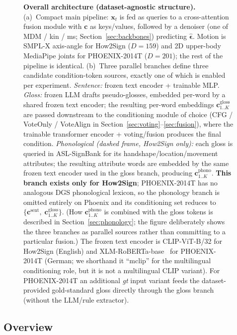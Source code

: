 \documentclass{article}
\begin{document}
\begin{figure}[t]
\caption{\textbf{Overall architecture (dataset-agnostic structure).}
(a)~Compact main pipeline: $\mathbf{x}_t$ is fed as queries to a \textcolor{orange!80!black}{cross-attention fusion} module with $\mathbf{c}$ as keys/values, followed by a \textcolor{green!50!black}{denoiser} (one of MDM / kin / ms; Section~\ref{sec:backbones}) predicting $\hat{\boldsymbol{\epsilon}}$. Motion is SMPL-X axis-angle for How2Sign ($D{=}159$) and 2D upper-body MediaPipe joints for PHOENIX-2014T ($D{=}201$); the rest of the pipeline is identical.
(b)~Three parallel branches define three candidate condition-token sources, exactly one of which is enabled per experiment. \textit{Sentence:} frozen text encoder + trainable MLP. \textit{Gloss:} frozen LLM drafts pseudo-glosses, embedded per-word by a shared frozen text encoder; the resulting per-word embeddings $\mathbf{c}^{\mathrm{gloss}}_{1..K}$ are passed downstream to the conditioning module of choice (CFG / VoteOnly / VoteAlign in Section~\ref{sec:voting}--\ref{sec:fusion}), where the trainable transformer encoder + voting/fusion produces the final condition. \textit{Phonological (dashed frame, How2Sign only):} each gloss is queried in ASL-SignBank for its handshape/location/movement attributes; the resulting attribute words are embedded by the same frozen text encoder used in the gloss branch, producing $\mathbf{c}^{\mathrm{phono}}_{1..K}$. \textbf{This branch exists only for How2Sign}; PHOENIX-2014T has no analogous DGS phonological lexicon, so the phonology branch is omitted entirely on Phoenix and its conditioning set reduces to $\{\mathbf{c}^{\mathrm{sent}},\; \mathbf{c}^{\mathrm{gloss}}_{1..K}\}$. (How $\mathbf{c}^{\mathrm{phono}}_{1..K}$ is combined with the gloss tokens is described in Section~\ref{sec:phonology}; the figure deliberately shows the three branches as parallel sources rather than committing to a particular fusion.)
The frozen text encoder is CLIP-ViT-B/32 for How2Sign (English) and XLM-RoBERTa-base~\citep{conneau2020xlmr} for PHOENIX-2014T (German; we shorthand it ``mclip'' for the multilingual conditioning role, but it is not a multilingual CLIP variant). For PHOENIX-2014T an additional \emph{gt} input variant feeds the dataset-provided gold-standard gloss directly through the gloss branch (without the LLM/rule extractor).}
\label{fig:architecture}
\end{figure}

\subsection{Overview}
\label{sec:overview}
\end{document}

